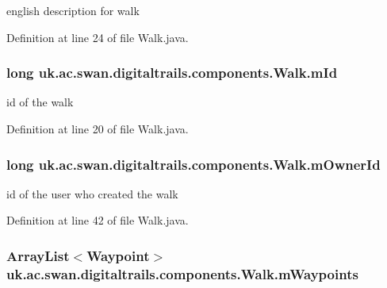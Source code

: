 english description for walk 



Definition at line 24 of file Walk.\+java.

\hypertarget{classuk_1_1ac_1_1swan_1_1digitaltrails_1_1components_1_1_walk_a3f58853b9e42a36f131e04efcfafd63f}{
\subsubsection[{m\+Id}]{\setlength{\rightskip}{0pt plus 5cm}long uk.\+ac.\+swan.\+digitaltrails.\+components.\+Walk.\+m\+Id\hspace{0.3cm}{\ttfamily [private]}}}\label{classuk_1_1ac_1_1swan_1_1digitaltrails_1_1components_1_1_walk_a3f58853b9e42a36f131e04efcfafd63f}


id of the walk 



Definition at line 20 of file Walk.\+java.

\hypertarget{classuk_1_1ac_1_1swan_1_1digitaltrails_1_1components_1_1_walk_a2f6232562dc0388422a492012b15f773}{
\subsubsection[{m\+Owner\+Id}]{\setlength{\rightskip}{0pt plus 5cm}long uk.\+ac.\+swan.\+digitaltrails.\+components.\+Walk.\+m\+Owner\+Id\hspace{0.3cm}{\ttfamily [private]}}}\label{classuk_1_1ac_1_1swan_1_1digitaltrails_1_1components_1_1_walk_a2f6232562dc0388422a492012b15f773}


id of the user who created the walk 



Definition at line 42 of file Walk.\+java.

\hypertarget{classuk_1_1ac_1_1swan_1_1digitaltrails_1_1components_1_1_walk_a47504a4f93ca4091881314da0d29929d}{
\subsubsection[{m\+Waypoints}]{\setlength{\rightskip}{0pt plus 5cm}Array\+List$<${\bf Waypoint}$>$ uk.\+ac.\+swan.\+digitaltrails.\+components.\+Walk.\+m\+Waypoints\hspace{0.3cm}{\ttfamily [private]}}}\label{classuk_1_1ac_1_1swan_1_1digitaltrails_1_1components_1_1_walk_a47504a4f93ca4091881314da0d29929d}



